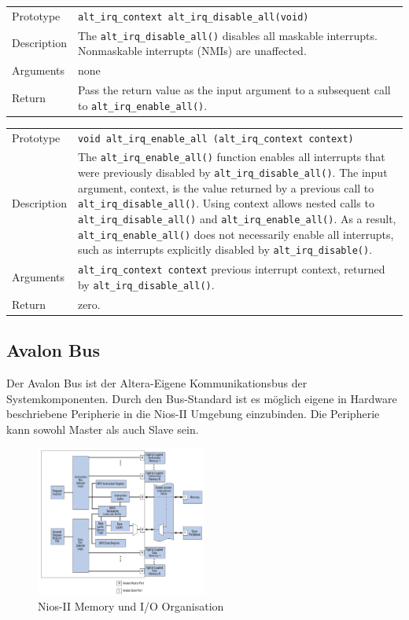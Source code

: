\documentclass[11pt,a4paper,oneside]{scrartcl}
\begin{document}
\begin{table}[h!]
\begin{tabular}[t]{p{} p{} }
Prototype & \lstinline$alt_irq_context alt_irq_disable_all(void)$ \\
Description & The \lstinline$alt_irq_disable_all()$ disables all maskable interrupts. Nonmaskable interrupts (NMIs) are unaffected.\\
Arguments & none \\
Return &  Pass the return value as the input argument to a subsequent call to \lstinline$alt_irq_enable_all()$.
\end{tabular}
\end{table}
\begin{table}[h!]
\begin{tabular}[t]{p{} p{} }
Prototype & \lstinline$void alt_irq_enable_all (alt_irq_context context)$ \\
Description & The \lstinline$alt_irq_enable_all()$ function enables all interrupts that were previously disabled by \lstinline$alt_irq_disable_all()$. The input argument, context, is the value returned by a previous call to \lstinline$alt_irq_disable_all()$. Using context allows nested calls to \lstinline$alt_irq_disable_all()$ and \lstinline$alt_irq_enable_all()$. As a result, \lstinline$alt_irq_enable_all()$ does not necessarily enable all interrupts, such as interrupts explicitly disabled by \lstinline$alt_irq_disable()$.\\
Arguments & \lstinline$alt_irq_context context$  previous interrupt context, returned by \lstinline$alt_irq_disable_all()$.\\
Return &  zero.
\end{tabular}
\end{table}
\newpage
\subsection{Avalon Bus}
Der Avalon Bus ist der Altera-Eigene Kommunikationsbus der Systemkomponenten. Durch den Bus-Standard ist es möglich eigene in Hardware beschriebene Peripherie in die Nios-II Umgebung einzubinden. Die Peripherie kann sowohl Master als auch Slave sein. 
\begin{figure}[h!]
\centering
\includegraphics[width=0.5\textwidth]{pic/NiosII_Memory_IO.png}
\caption{Nios-II Memory und I/O Organisation}
\end{figure}
\end{document}
